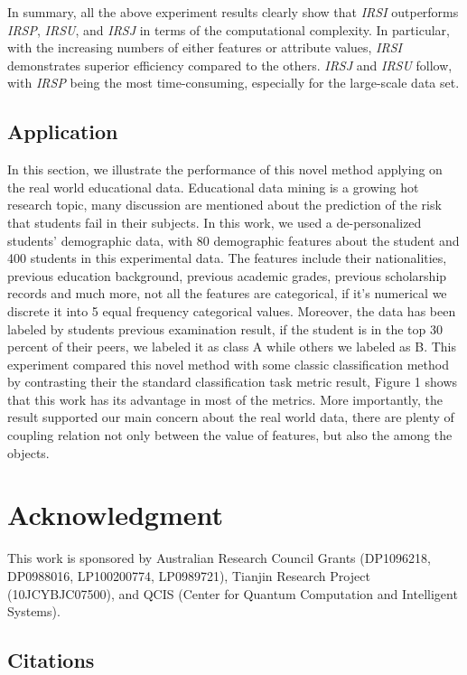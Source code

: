 \documentclass{article}
\numberwithin{equation}{section}
\begin{document}
\vspace{0.1cm}
In summary, all the above experiment results clearly show that \emph{IRSI} outperforms \emph{IRSP}, \emph{IRSU}, and \emph{IRSJ} in terms of the computational complexity. In particular, with the increasing numbers of either features or attribute values, \emph{IRSI} demonstrates superior efficiency compared to the others. \emph{IRSJ} and \emph{IRSU} follow, with \emph{IRSP} being the most time-consuming, especially for the large-scale data set.

\subsection{Application}
In this section, we illustrate the performance of this novel method applying on the real world educational data. Educational data mining is a growing hot research topic, many discussion are mentioned about the prediction of the risk that students fail in their subjects. In this work, we used a de-personalized students' demographic data, with 80 demographic features about the student and 400 students in this experimental data. The features include their nationalities, previous education background, previous academic grades, previous scholarship records and much more, not all the features are categorical, if it's numerical we discrete it into 5 equal frequency categorical values. Moreover, the data has been labeled by students previous examination result, if the student is in the top 30 percent of their peers, we labeled it as class A while others we labeled as B. This experiment compared this novel method with some classic classification method by contrasting their the standard classification task metric result, Figure 1 shows that this work has its advantage in most of the metrics. More importantly, the result supported our main concern about the real world data, there are plenty of coupling relation not only between the value of features, but also the among the objects.

\section{Acknowledgment}
This work is sponsored by Australian Research Council Grants (DP1096218, DP0988016, LP100200774, LP0989721), Tianjin Research Project (10JCYBJC07500), and QCIS (Center for Quantum Computation and Intelligent Systems).

\subsection{Citations}
\end{document}
